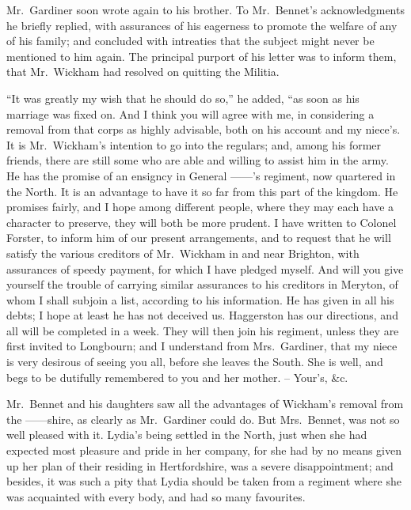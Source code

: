 \strut

Mr.\ Gardiner soon wrote again to his brother. To
Mr.\ Bennet’s acknowledgments he briefly replied, with
assurances of his eagerness to promote the welfare of any
of his family; and concluded with intreaties that the
subject might never be mentioned to him again. The
principal purport of his letter was to inform them, that
Mr.\ Wickham had resolved on quitting the Militia.

“It was greatly my wish that he should do so,” he
added, “as soon as his marriage was fixed on. And
I think you will agree with me, in considering a removal
from that corps as highly advisable, both on his account
and my niece’s. It is Mr.\ Wickham’s intention to go into
the regulars; and, among his former friends, there are
still some who are able and willing to assist him in the
army. He has the promise of an ensigncy in General
------’s regiment, now quartered in the North. It is an
advantage to have it so far from this part of the kingdom.
He promises fairly, and I hope among different people,
where they may each have a character to preserve, they
will both be more prudent. I have written to Colonel
Forster, to inform him of our present arrangements, and
to request that he will satisfy the various creditors of
Mr.\ Wickham in and near Brighton, with assurances of
speedy payment, for which I have pledged myself. And
will you give yourself the trouble of carrying similar
assurances to his creditors in Meryton, of whom I shall
subjoin a list, according to his information. He has
given in all his debts; I hope at least he has not deceived
us. Haggerston has our directions, and all will be completed
in a week. They will then join his regiment, unless
they are first invited to Longbourn; and I understand
from Mrs.\ Gardiner, that my niece is very desirous of
seeing you all, before she leaves the South. She is well,
and begs to be dutifully remembered to you and her
mother. -- Your’s, \&c.


\strut

Mr.\ Bennet and his daughters saw all the advantages
of Wickham’s removal from the ------shire, as clearly as
Mr.\ Gardiner could do. But Mrs.\ Bennet, was not so well
pleased with it. Lydia’s being settled in the North, just
when she had expected most pleasure and pride in her
company, for she had by no means given up her plan of
their residing in Hertfordshire, was a severe disappointment;
and besides, it was such a pity that Lydia should
be taken from a regiment where she was acquainted with
every body, and had so many favourites.

